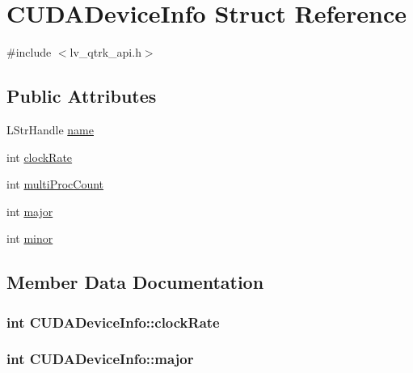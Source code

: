 \hypertarget{struct_c_u_d_a_device_info}{}\section{C\+U\+D\+A\+Device\+Info Struct Reference}
\label{struct_c_u_d_a_device_info}


{\ttfamily \#include $<$lv\+\_\+qtrk\+\_\+api.\+h$>$}

\subsection*{Public Attributes}
\begin{DoxyCompactItemize}
\item 
L\+Str\+Handle \hyperlink{struct_c_u_d_a_device_info_a58843d89b2ccb6dcb9c7c0c9337e030b}{name}
\item 
int \hyperlink{struct_c_u_d_a_device_info_a4eedab9d5e24fc4f832f8a239768bed7}{clock\+Rate}
\item 
int \hyperlink{struct_c_u_d_a_device_info_aa49e12b08b205bd073e1d0fbf9f06815}{multi\+Proc\+Count}
\item 
int \hyperlink{struct_c_u_d_a_device_info_a2e19be519706c8a692ba72a814a839a7}{major}
\item 
int \hyperlink{struct_c_u_d_a_device_info_aece001b941ba540febcdd704bd6b6e86}{minor}
\end{DoxyCompactItemize}


\subsection{Member Data Documentation}
\subsubsection[{\texorpdfstring{clock\+Rate}{clockRate}}]{\setlength{\rightskip}{0pt plus 5cm}int C\+U\+D\+A\+Device\+Info\+::clock\+Rate}\hypertarget{struct_c_u_d_a_device_info_a4eedab9d5e24fc4f832f8a239768bed7}{}\label{struct_c_u_d_a_device_info_a4eedab9d5e24fc4f832f8a239768bed7}
\subsubsection[{\texorpdfstring{major}{major}}]{\setlength{\rightskip}{0pt plus 5cm}int C\+U\+D\+A\+Device\+Info\+::major}\hypertarget{struct_c_u_d_a_device_info_a2e19be519706c8a692ba72a814a839a7}{}\label{struct_c_u_d_a_device_info_a2e19be519706c8a692ba72a814a839a7}
